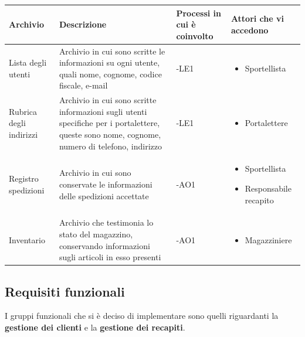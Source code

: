 \begin{table}
  \centering
  \begin{tabular}{|>{\centering\arraybackslash}m{}|
                  >{\centering\arraybackslash}m{}|
                  >{\centering\arraybackslash}m{}|
                  >{\centering\arraybackslash}m{}|}
    \hline
    \textbf{Archivio} & \textbf{Descrizione} & \textbf{Processi in cui è coinvolto} & \textbf{Attori che vi accedono} \\ \hline
    Lista degli utenti & Archivio in cui sono scritte le informazioni su ogni utente, quali nome, cognome, codice fiscale, e-mail & -LE1 & \begin{itemize}
      \item Sportellista
    \end{itemize} \\ 
    \hline 
    Rubrica degli indirizzi & Archivio in cui sono scritte informazioni sugli utenti specifiche per i portalettere, queste sono nome, cognome, numero di telefono,
    indirizzo & -LE1 & \begin{itemize}
      \item Portalettere
    \end{itemize} \\ 
    \hline
    Registro spedizioni & Archivio in cui sono conservate le informazioni delle spedizioni accettate & -AO1 &
    \begin{itemize}
      \item{Sportellista}
      \item{Responsabile recapito}
    \end{itemize} \\
    \hline
    Inventario & Archivio che testimonia lo stato del magazzino, conservando informazioni sugli articoli in esso presenti & -AO1 &
    \begin{itemize}
      \item{Magazziniere}
    \end{itemize} \\
    \hline
  \end{tabular}
\end{table}

\newpage
\subsection{Requisiti funzionali}
I gruppi funzionali che si è deciso di implementare sono quelli riguardanti la \textbf{gestione dei clienti} e la \textbf{gestione dei recapiti}.

